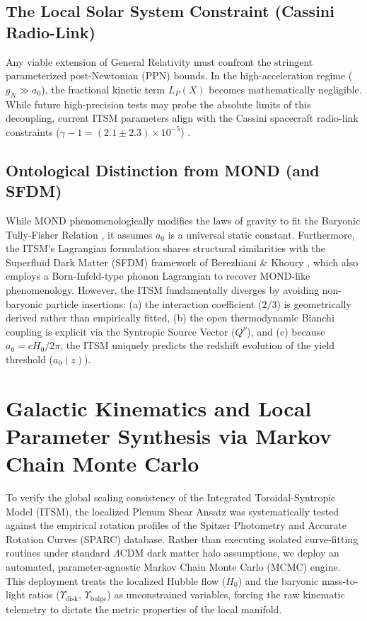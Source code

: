 \documentclass[aps,prd,10pt,onecolumn,superscriptaddress,nofootinbib]{revtex4-2}
\begin{document}
\subsection{The Local Solar System Constraint (Cassini Radio-Link)}
Any viable extension of General Relativity must confront the stringent parameterized post-Newtonian (PPN) bounds. In the high-acceleration regime ($g_N \gg a_0$), the fractional kinetic term $L_P(X)$ becomes mathematically negligible. While future high-precision tests may probe the absolute limits of this decoupling, current ITSM parameters align with the Cassini spacecraft radio-link constraints ($\gamma - 1 = (2.1 \pm 2.3) \times 10^{-5}$) \cite{cassini}.

\subsection{Ontological Distinction from MOND (and SFDM)}
While MOND phenomenologically modifies the laws of gravity to fit the Baryonic Tully-Fisher Relation \cite{mond}, it assumes $a_0$ is a universal static constant. Furthermore, the ITSM's Lagrangian formulation shares structural similarities with the Superfluid Dark Matter (SFDM) framework of Berezhiani \& Khoury \cite{sf_dm}, which also employs a Born-Infeld-type phonon Lagrangian to recover MOND-like phenomenology. However, the ITSM fundamentally diverges by avoiding non-baryonic particle insertions: (a) the interaction coefficient ($2/3$) is geometrically derived rather than empirically fitted, (b) the open thermodynamic Bianchi coupling is explicit via the Syntropic Source Vector ($Q^\nu$), and (c) because $a_0 = c H_0 / 2\pi$, the ITSM uniquely predicts the redshift evolution of the yield threshold ($a_0(z)$).

\section{\label{sec:kinematics}Galactic Kinematics and Local Parameter Synthesis via Markov Chain Monte Carlo}

To verify the global scaling consistency of the Integrated Toroidal-Syntropic Model (ITSM), the localized Plenum Shear Ansatz was systematically tested against the empirical rotation profiles of the Spitzer Photometry and Accurate Rotation Curves (SPARC) database. Rather than executing isolated curve-fitting routines under standard $\Lambda$CDM dark matter halo assumptions, we deploy an automated, parameter-agnostic Markov Chain Monte Carlo (MCMC) engine. This deployment treats the localized Hubble flow ($H_0$) and the baryonic mass-to-light ratios ($\Upsilon_{\text{disk}}$, $\Upsilon_{\text{bulge}}$) as unconstrained variables, forcing the raw kinematic telemetry to dictate the metric properties of the local manifold.
\end{document}
